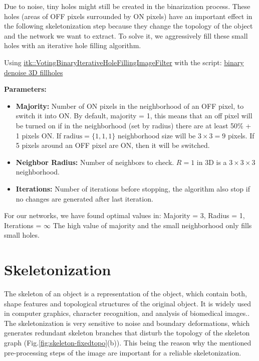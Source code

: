 Due to noise, tiny holes might still be created in the binarization process. These holes (areas of OFF pixels surrounded by ON pixels) have an important effect in the following skeletonization step because they change the topology of the object and the network we want to extract. To solve it, we aggressively fill these small holes with an iterative hole filling algorithm.


Using \href{https://itk.org/Doxygen/html/classitk_1_1VotingBinaryIterativeHoleFillingImageFilter.html}{itk::VotingBinaryIterativeHoleFillingImageFilter} with the script:
\href{https://github.com/phcerdan/ITKfilters/blob/master/scripts-python/binary_denoise_3d_fillholes_iterative.py}{binary denoise 3D fillholes}

\noindent\textbf{Parameters:}

\begin{itemize}[topsep=0pt]
  \item \textbf{Majority: } Number of ON pixels in the neighborhood of an OFF pixel, to switch it into ON. By default, majority = 1, this means that an off pixel will be turned on if in the neighborhood (set by radius) there are at least 50\% + 1 pixels ON. If $\text{radius} = \{1,1,1\}$ neighborhood size will be $3\times3 = 9$ pixels. If 5 pixels around an OFF pixel are ON, then it will be switched.
  \item \textbf{Neighbor Radius: } Number of neighbors to check. $R = 1$ in 3D is a $3\times3\times3$ neighborhood.
  \item \textbf{Iterations: } Number of iterations before stopping, the algorithm also stop if no changes are generated after last iteration.
\end{itemize}

For our networks, we have found optimal values in:\newline
Majority = 3, Radius = 1, Iterations = $\infty$ \newline
The high value of majority and the small neighborhood only fills small holes.



\section{Skeletonization}%
\label{sec:skeletonization}

The skeleton of an object is a representation of the object, which contain both,
shape features and topological structures of the original object. It is widely
used in computer graphics, character recognition, and analysis of biomedical
images.\citep{bai_skeleton_2007,golland_fixed_2000,ge_generation_1996}. The
skeletonization is very sensitive to noise and boundary deformations, which generates redundant skeleton branches that disturb the
topology of the skeleton graph (Fig.\ref{fig:skeleton-fixedtopo}(b)). This being the reason why the mentioned pre-processing steps of the image are important for a reliable skeletonization.

